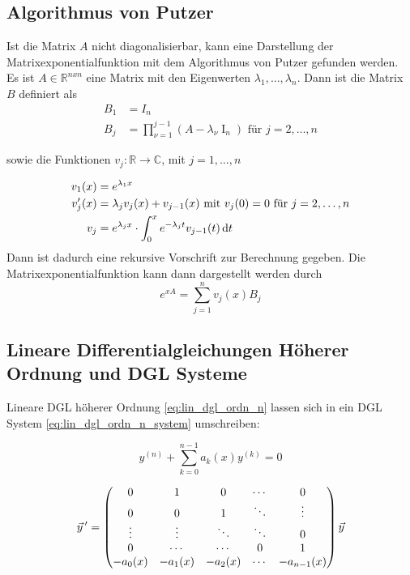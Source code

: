\subsection{Algorithmus von Putzer}
Ist die Matrix $A$ nicht diagonalisierbar, kann eine Darstellung der Matrixexponentialfunktion mit dem Algorithmus von Putzer gefunden werden.\\
Es ist $A\in\mathbb{R}^{nxn}$ eine Matrix mit den Eigenwerten $\lambda_1,\dots,\lambda_n$. Dann ist die Matrix $B$ definiert als
\begin{align*}
    B_1 &= I_n\\
    B_j&=\prod_{\nu=1}^{j-1}(A-\lambda_\nu\operatorname{I}_n) \text{ für } j=2,\dots,n
\end{align*}

sowie die Funktionen $v_j:\mathbb{R}\to\mathbb{C}$, mit $j=1,\dots,n$

\begin{align*}
    v_1(x)&=e^{\lambda_1x}\\
    v_j'(x)&= \lambda_j v_j(x)+v_{j-1}(x) \text{ mit } v_j(0)=0 \text{ für }j=2,\dots,n\\
    v_j &= e^{\lambda_jx}\cdot \int^{x}_0 e^{-\lambda_jt}v_{j-1}(t)\mathop{}\!\mathrm{d} t
\end{align*}
Dann ist dadurch eine rekursive Vorschrift zur Berechnung gegeben. Die Matrixexponentialfunktion kann dann dargestellt werden durch
\begin{equation*}
    e^{xA}=\sum_{j=1}^n v_j(x) B_j
\end{equation*}

\subsection{Lineare Differentialgleichungen Höherer Ordnung und DGL Systeme}
Lineare DGL höherer Ordnung \eqref{eq:lin_dgl_ordn_n} lassen sich in ein DGL System \eqref{eq:lin_dgl_ordn_n_system} umschreiben:

\begin{equation}
    \label{eq:lin_dgl_ordn_n}
    y^{(n)}+\sum_{k=0}^{n-1} a_k(x)y^{(k)}=0
\end{equation}

\begin{equation}
\label{eq:lin_dgl_ordn_n_system}
\vec y\,' = 
\begin{pmatrix}
0 & 1 & 0 & \cdots & 0 \\
0 & 0 & 1 & \ddots & \vdots \\
\vdots & \vdots & \ddots & \ddots & 0 \\
0 & \cdots & \cdots & 0 & 1 \\
-a_0(x) & -a_1(x) & -a_2(x) & \cdots & -a_{n-1}(x)
\end{pmatrix}
\vec{y}
\end{equation}

